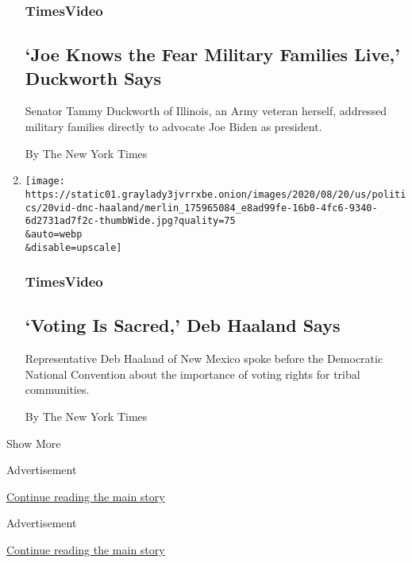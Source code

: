 \begin{enumerate}
{  \subsubsection{TimesVideo}\label{timesvideo-6}}

  \hypertarget{joe-knows-the-fear-military-families-live-duckworth-says}{%
  \subsection{`Joe Knows the Fear Military Families Live,' Duckworth
  Says}\label{joe-knows-the-fear-military-families-live-duckworth-says}}

  Senator Tammy Duckworth of Illinois, an Army veteran herself,
  addressed military families directly to advocate Joe Biden as
  president.

  By The New York Times
\item
  \href{/video/us/elections/100000007299756/deb-haaland-speaks-dnc.html}{}

  \texttt{[image: https://static01.graylady3jvrrxbe.onion/images/2020/08/20/us/politics/20vid-dnc-haaland/merlin\_175965084\_e8ad99fe-16b0-4fc6-9340-6d2731ad7f2c-thumbWide.jpg?quality=75\\\&auto=webp\\\&disable=upscale]}

  \hypertarget{timesvideo-7}{%
  \subsubsection{TimesVideo}\label{timesvideo-7}}

  \hypertarget{voting-is-sacred-deb-haaland-says}{%
  \subsection{`Voting Is Sacred,' Deb Haaland
  Says}\label{voting-is-sacred-deb-haaland-says}}

  Representative Deb Haaland of New Mexico spoke before the Democratic
  National Convention about the importance of voting rights for tribal
  communities.

  By The New York Times
\end{enumerate}

Show More

Advertisement

\protect\hyperlink{after-mid1}{Continue reading the main story}

Advertisement

\protect\hyperlink{after-mktg}{Continue reading the main story}

